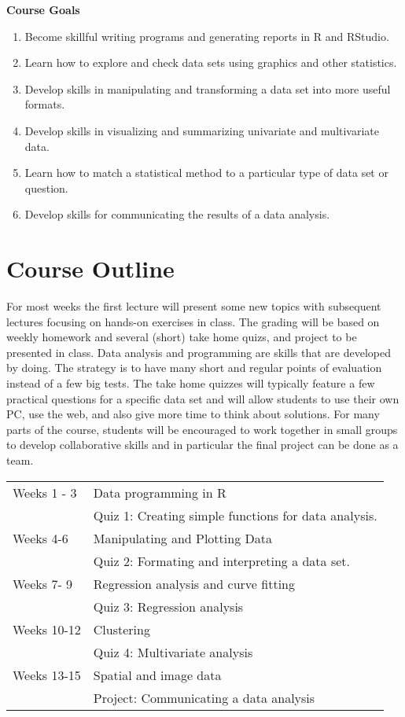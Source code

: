 \documentclass[12pt]{article}
\begin{document}
 {\bf Course Goals} 
 \begin{enumerate}
 \item Become skillful writing programs and generating reports in R and RStudio.
 \item Learn how to explore and check data sets using graphics and other statistics. 
 \item Develop skills in manipulating and transforming a data set into more useful formats. 
 \item Develop skills in visualizing and summarizing univariate and multivariate data.
 \item Learn how to match a statistical method to a particular type of data set or question. 
 \item Develop skills for communicating the results of a data analysis. 
 \end{enumerate} 
\section*{Course Outline}
For most weeks the first lecture will present some new topics with subsequent lectures focusing on  hands-on exercises in class. 
The grading will be based on weekly homework and several (short) take home quizs, and project to be presented in class. 
Data analysis and programming are skills that are developed by doing. The strategy is to have many short and regular points of evaluation instead of a few big tests. The take home quizzes will typically feature a few practical questions for a specific data set and will allow students to use their own PC, use the web, and also give more time to think about solutions. 
For many parts of the course, students will be encouraged to work together in small groups to develop collaborative skills and in particular the final project can be done as a team.  

\begin{tabular}{ll}
Weeks 1 - 3 &  Data programming in R  \\
& Quiz 1: Creating simple functions for data analysis. \\
Weeks  4-6 &  Manipulating and Plotting Data \\
& Quiz 2:  Formating and interpreting a data set. \\
Weeks  7- 9 & Regression analysis and curve fitting \\
& Quiz 3:  Regression analysis \\
Weeks  10-12 & Clustering \\
& Quiz 4:  Multivariate analysis\\
Weeks  13-15 & Spatial and image data  \\
& Project:  Communicating a data analysis\\
\end{tabular}
\end{document}
